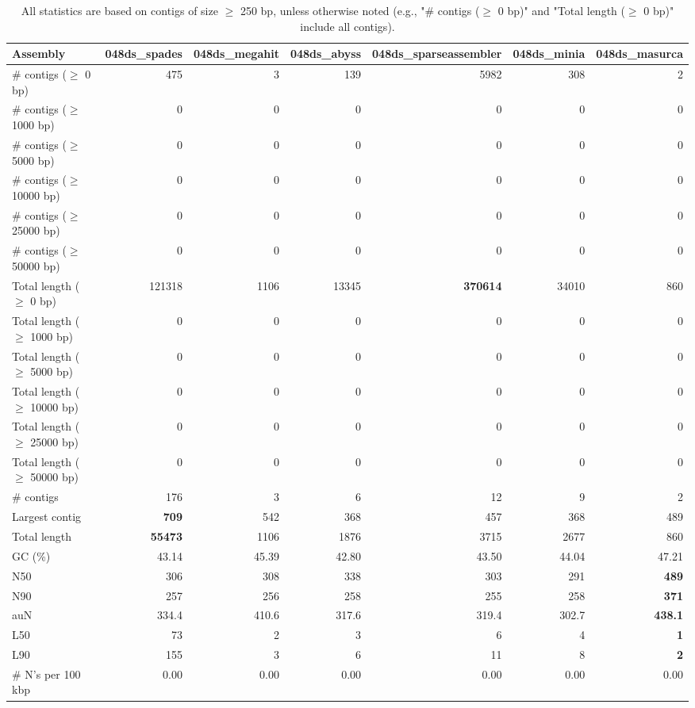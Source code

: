 \documentclass[12pt,a4paper]{article}
\begin{document}
\begin{table}[ht]
\begin{center}
\caption{All statistics are based on contigs of size $\geq$ 250 bp, unless otherwise noted (e.g., "\# contigs ($\geq$ 0 bp)" and "Total length ($\geq$ 0 bp)" include all contigs).}
\begin{tabular}{|l*{6}{|r}|}
\hline
Assembly & 048ds\_spades & 048ds\_megahit & 048ds\_abyss & 048ds\_sparseassembler & 048ds\_minia & 048ds\_masurca \\ \hline
\# contigs ($\geq$ 0 bp) & 475 & 3 & 139 & 5982 & 308 & 2 \\ \hline
\# contigs ($\geq$ 1000 bp) & 0 & 0 & 0 & 0 & 0 & 0 \\ \hline
\# contigs ($\geq$ 5000 bp) & 0 & 0 & 0 & 0 & 0 & 0 \\ \hline
\# contigs ($\geq$ 10000 bp) & 0 & 0 & 0 & 0 & 0 & 0 \\ \hline
\# contigs ($\geq$ 25000 bp) & 0 & 0 & 0 & 0 & 0 & 0 \\ \hline
\# contigs ($\geq$ 50000 bp) & 0 & 0 & 0 & 0 & 0 & 0 \\ \hline
Total length ($\geq$ 0 bp) & 121318 & 1106 & 13345 & {\bf 370614} & 34010 & 860 \\ \hline
Total length ($\geq$ 1000 bp) & 0 & 0 & 0 & 0 & 0 & 0 \\ \hline
Total length ($\geq$ 5000 bp) & 0 & 0 & 0 & 0 & 0 & 0 \\ \hline
Total length ($\geq$ 10000 bp) & 0 & 0 & 0 & 0 & 0 & 0 \\ \hline
Total length ($\geq$ 25000 bp) & 0 & 0 & 0 & 0 & 0 & 0 \\ \hline
Total length ($\geq$ 50000 bp) & 0 & 0 & 0 & 0 & 0 & 0 \\ \hline
\# contigs & 176 & 3 & 6 & 12 & 9 & 2 \\ \hline
Largest contig & {\bf 709} & 542 & 368 & 457 & 368 & 489 \\ \hline
Total length & {\bf 55473} & 1106 & 1876 & 3715 & 2677 & 860 \\ \hline
GC (\%) & 43.14 & 45.39 & 42.80 & 43.50 & 44.04 & 47.21 \\ \hline
N50 & 306 & 308 & 338 & 303 & 291 & {\bf 489} \\ \hline
N90 & 257 & 256 & 258 & 255 & 258 & {\bf 371} \\ \hline
auN & 334.4 & 410.6 & 317.6 & 319.4 & 302.7 & {\bf 438.1} \\ \hline
L50 & 73 & 2 & 3 & 6 & 4 & {\bf 1} \\ \hline
L90 & 155 & 3 & 6 & 11 & 8 & {\bf 2} \\ \hline
\# N's per 100 kbp & 0.00 & 0.00 & 0.00 & 0.00 & 0.00 & 0.00 \\ \hline
\end{tabular}
\end{center}
\end{table}
\end{document}
